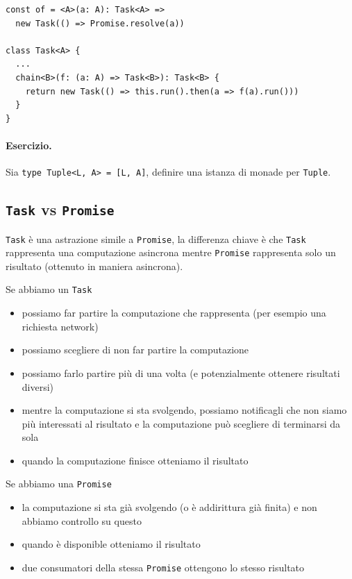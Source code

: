 \documentclass[12pt]{article}
\begin{document}
\begin{verbatim}
const of = <A>(a: A): Task<A> =>
  new Task(() => Promise.resolve(a))

class Task<A> {
  ...
  chain<B>(f: (a: A) => Task<B>): Task<B> {
    return new Task(() => this.run().then(a => f(a).run()))
  }
}
\end{verbatim}

\paragraph{Esercizio. } Sia \texttt{type Tuple<L, A> = [L, A]}, definire una istanza di monade per \texttt{Tuple}.

\subsection{\texttt{Task} vs \texttt{Promise}}

\texttt{Task} è una astrazione simile a \texttt{Promise}, la differenza chiave è che \texttt{Task} rappresenta una computazione asincrona
mentre \texttt{Promise} rappresenta solo un risultato (ottenuto in maniera asincrona).

Se abbiamo un \texttt{Task}

\begin{itemize}
  \item possiamo far partire la computazione che rappresenta (per esempio una richiesta network)
  \item possiamo scegliere di non far partire la computazione
  \item possiamo farlo partire più di una volta (e potenzialmente ottenere risultati diversi)
  \item mentre la computazione si sta svolgendo, possiamo notificagli che non siamo più interessati al risultato e la computazione può scegliere di terminarsi da sola
  \item quando la computazione finisce otteniamo il risultato
\end{itemize}

Se abbiamo una \texttt{Promise}

\begin{itemize}
  \item la computazione si sta già svolgendo (o è addirittura già finita) e non abbiamo controllo su questo
  \item quando è disponible otteniamo il risultato
  \item due consumatori della stessa \texttt{Promise} ottengono lo stesso risultato
\end{itemize}
\end{document}
